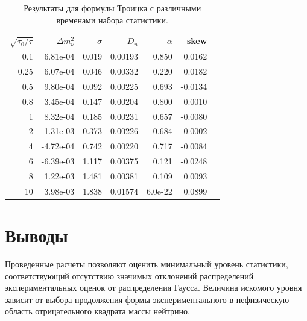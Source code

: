 \documentclass[a4paper,14pt]{extarticle}
\begin{document}
    \begin{table}[h!]
	    \begin{center}
	      \caption{Результаты для формулы Троицка с различными временами набора статистики.}
		    \begin{tabular}{|r|r|r|r|r|r|r|}
			    \hline
			    $\sqrt{\tau_0/\tau}$ & $\Delta m^2_\nu$ & $\sigma$ & $D_n$ & $\alpha$ & skew \\
			    \hline
			    0.1 & 6.81e-04 & 0.019 & 0.00193 & 0.850 & 0.0162 \\
			    \hline
			    0.25 & 6.07e-04 & 0.046 & 0.00332 & 0.220 & 0.0182 \\
			    \hline
			    0.5 & 9.80e-04 & 0.092 & 0.00225 & 0.693 & -0.0134 \\
			    \hline
			    0.8 & 3.45e-04 & 0.147 & 0.00204 & 0.800 & 0.0010 \\
			    \hline
			    1 & 8.32e-04 & 0.185 & 0.00231 & 0.657 & -0.0080 \\
			    \hline
			    2 & -1.31e-03 & 0.373 & 0.00226 & 0.684 & 0.0002 \\
			    \hline
			    4 & -4.72e-04 & 0.742 & 0.00220 & 0.717 & -0.0084 \\
			    \hline
			    6 & -6.39e-03 & 1.117 & 0.00375 & 0.121 & -0.0248 \\
			    \hline
			    8 & 1.22e-03 & 1.481 & 0.00381 & 0.109 & 0.0093 \\
			    \hline
			    10 & 3.98e-03 & 1.838 & 0.01574 & 6.0e-22 & 0.0899 \\
			    \hline
		    \end{tabular}
	    \end{center}
    \end{table}
    
    

    
    
    


    \newpage
    \section{Выводы}
    Проведенные расчеты позволяют оценить минимальный уровень статистики, соответствующий отсутствию
    значимых отклонений распределений экспериментальных оценок от распределения Гаусса. Величина искомого
    уровня зависит от выбора продолжения формы экспериментального в нефизическую область отрицательного
    квадрата массы нейтрино.
    
\end{document}
